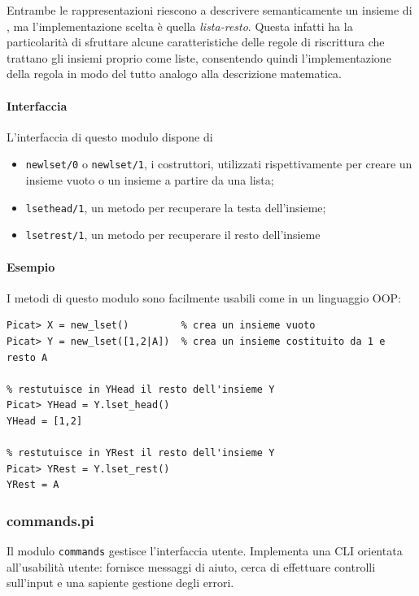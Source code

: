 \documentclass[12pt,a4paper,openright]{book} %
\begin{document}
Entrambe le rappresentazioni riescono a descrivere semanticamente un
insieme di \lset{}, ma l'implementazione scelta è quella
\emph{lista-resto}. Questa infatti ha la particolarità di sfruttare
alcune caratteristiche delle regole di riscrittura che trattano gli
insiemi proprio come liste, consentendo quindi l'implementazione della
regola in modo del tutto analogo alla descrizione matematica.

\paragraph{Interfaccia}

L'interfaccia di questo modulo dispone di
\begin{itemize}
	\item \texttt{new\textunderscore lset/0} o
          \texttt{new\textunderscore lset/1}, i costruttori,
          utilizzati rispettivamente per creare un insieme vuoto o un
          insieme a partire da una lista;
	\item \texttt{lset\textunderscore head/1}, un metodo per
          recuperare la testa dell'insieme;
	\item \texttt{lset\textunderscore rest/1}, un metodo per
          recuperare il resto dell'insieme
\end{itemize}

\paragraph{Esempio}

I metodi di questo modulo sono facilmente usabili come in un
linguaggio OOP:
\begin{verbatim}
Picat> X = new_lset()         % crea un insieme vuoto
Picat> Y = new_lset([1,2|A])  % crea un insieme costituito da 1 e resto A

% restutuisce in YHead il resto dell'insieme Y
Picat> YHead = Y.lset_head()
YHead = [1,2]

% restutuisce in YRest il resto dell'insieme Y
Picat> YRest = Y.lset_rest()
YRest = A
\end{verbatim}


\subsubsection{commands.pi}

Il modulo \texttt{commands} gestisce l'interfaccia utente. Implementa
una CLI orientata all'usabilità utente: fornisce messaggi di aiuto,
cerca di effettuare controlli sull'input e una sapiente gestione degli
errori.
\end{document}
